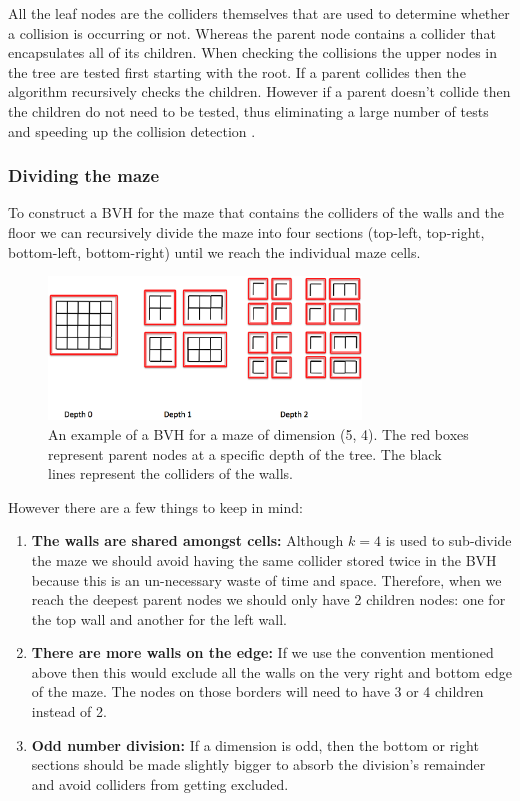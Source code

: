 All the leaf nodes are the colliders themselves that are used to determine whether a collision is occurring or not. Whereas the parent node contains a collider that encapsulates all of its children. When checking the collisions the upper nodes in the tree are tested first starting with the root. If a parent collides then the algorithm recursively checks the children. However if a parent doesn't collide then the children do not need to be tested, thus eliminating a large number of tests and speeding up the collision detection \citep{BVH}.

\subsubsection{Dividing the maze}
To construct a BVH for the maze that contains the colliders of the walls and the floor we can recursively divide the maze into four sections (top-left, top-right, bottom-left, bottom-right) until we reach the individual maze cells.

\begin{figure}[h!]
\centering
 \includegraphics[width=0.74\textwidth]{images/bvh_maze.png}
\caption{An example of a BVH for a maze of dimension (5, 4). The red boxes represent parent nodes at a specific depth of the tree. The black lines represent the colliders of the walls.}
\end{figure}

However there are a few things to keep in mind:
\begin{enumerate}
\item {\bf The walls are shared amongst cells:} Although $k=4$ is used to sub-divide the maze we should avoid having the same collider stored twice in the BVH because this is an un-necessary waste of time and space. Therefore, when we reach the deepest parent nodes we should only have 2 children nodes: one for the top wall and another for the left wall.
\item {\bf There are more walls on the edge:} If we use the convention mentioned above then this would exclude all the walls on the very right and bottom edge of the maze. The nodes on those borders will need to have 3 or 4 children instead of 2.
\item {\bf Odd number division:} If a dimension is odd, then the bottom or right sections should be made slightly bigger to absorb the division's remainder and avoid colliders from getting excluded.
\end{enumerate}

